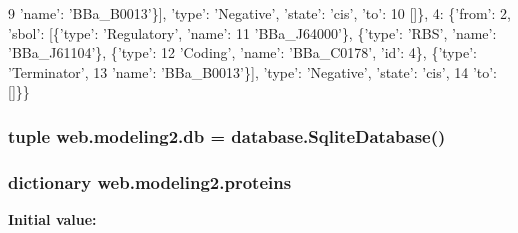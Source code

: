 \begin{DoxyCode}
9               \textcolor{stringliteral}{'name'}: \textcolor{stringliteral}{'BBa\_B0013'}\}], \textcolor{stringliteral}{'type'}: \textcolor{stringliteral}{'Negative'}, \textcolor{stringliteral}{'state'}: \textcolor{stringliteral}{'cis'}, \textcolor{stringliteral}{'to'}:
10             []\}, 4: \{\textcolor{stringliteral}{'from'}: 2, \textcolor{stringliteral}{'sbol'}: [\{\textcolor{stringliteral}{'type'}: \textcolor{stringliteral}{'Regulatory'}, \textcolor{stringliteral}{'name'}:
11               \textcolor{stringliteral}{'BBa\_J64000'}\}, \{\textcolor{stringliteral}{'type'}: \textcolor{stringliteral}{'RBS'}, \textcolor{stringliteral}{'name'}: \textcolor{stringliteral}{'BBa\_J61104'}\}, \{\textcolor{stringliteral}{'type'}:
12                 \textcolor{stringliteral}{'Coding'}, \textcolor{stringliteral}{'name'}: \textcolor{stringliteral}{'BBa\_C0178'}, \textcolor{stringliteral}{'id'}: 4\}, \{\textcolor{stringliteral}{'type'}: \textcolor{stringliteral}{'Terminator'},
13                   \textcolor{stringliteral}{'name'}: \textcolor{stringliteral}{'BBa\_B0013'}\}], \textcolor{stringliteral}{'type'}: \textcolor{stringliteral}{'Negative'}, \textcolor{stringliteral}{'state'}: \textcolor{stringliteral}{'cis'},
14                 \textcolor{stringliteral}{'to'}: []\}\}
\end{DoxyCode}
\hypertarget{namespaceweb_1_1modeling2_a6628c8cbbaee8f2ab5b9e73ca321c0bd}{
\subsubsection[{db}]{\setlength{\rightskip}{0pt plus 5cm}tuple web.\-modeling2.\-db = {\bf database.\-Sqlite\-Database}()}}\label{namespaceweb_1_1modeling2_a6628c8cbbaee8f2ab5b9e73ca321c0bd}
\hypertarget{namespaceweb_1_1modeling2_a0f584bb39bca55bd6be2522fc91cb7de}{
\subsubsection[{proteins}]{\setlength{\rightskip}{0pt plus 5cm}dictionary web.\-modeling2.\-proteins}}\label{namespaceweb_1_1modeling2_a0f584bb39bca55bd6be2522fc91cb7de}
{\bfseries Initial value\-:}
